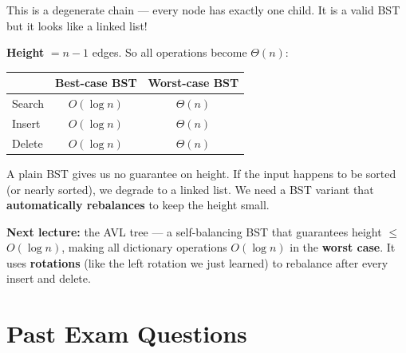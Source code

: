 \documentclass[11pt]{article}
\begin{document}
This is a \textcolor{rustW}{degenerate chain} — every node has exactly one child. It is a valid BST but it looks like a linked list!

\textbf{Height} $= n - 1$ edges. So all operations become $\Theta(n)$:

\begin{center}
\renewcommand{\arraystretch}{1.4}
\begin{tabular}{l c c}
& \textbf{Best-case BST} & \textbf{Worst-case BST} \\
\hline
Search & $O(\log n)$ & \textcolor{rustW}{$\Theta(n)$} \\
Insert & $O(\log n)$ & \textcolor{rustW}{$\Theta(n)$} \\
Delete & $O(\log n)$ & \textcolor{rustW}{$\Theta(n)$} \\
\end{tabular}
\end{center}

\begin{warnbox}
A plain BST gives us no guarantee on height. If the input happens to be sorted (or nearly sorted), we degrade to a linked list. We need a BST variant that \textbf{automatically rebalances} to keep the height small.
\end{warnbox}

\textcolor{violetT}{\textbf{Next lecture:}} the \textcolor{rustW}{AVL tree} — a self-balancing BST that guarantees height $\leq$ \textcolor{greenO}{$O(\log n)$}, making all dictionary operations $O(\log n)$ in the \textbf{worst case}. It uses \textbf{rotations} (like the left rotation we just learned) to rebalance after every insert and delete.

\section{Past Exam Questions}
\end{document}
